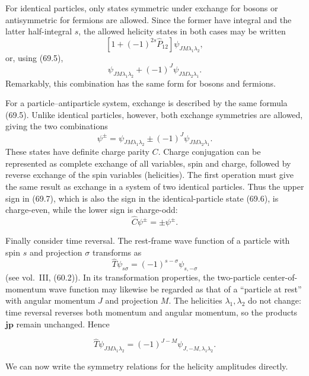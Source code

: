 For identical particles, only states symmetric under exchange for bosons or antisymmetric for fermions are allowed. Since the former have integral and the latter half-integral $s$, the allowed helicity states in both cases may be written
\[
\left[1+(-1)^{2s}\widehat P_{12}\right]\psi_{JM\lambda_1\lambda_2},
\]
or, using (69.5),
\begin{equation}
\psi_{JM\lambda_1\lambda_2}+(-1)^J\psi_{JM\lambda_2\lambda_1}.
\tag{69.6}
\end{equation}
Remarkably, this combination has the same form for bosons and fermions.

For a particle--antiparticle system, exchange is described by the same formula (69.5). Unlike identical particles, however, both exchange symmetries are allowed, giving the two combinations
\begin{equation}
\psi^\pm=\psi_{JM\lambda_1\lambda_2}\pm(-1)^J\psi_{JM\lambda_2\lambda_1}.
\tag{69.7}
\end{equation}
These states have definite charge parity $C$. Charge conjugation can be represented as complete exchange of all variables, spin and charge, followed by reverse exchange of the spin variables (helicities). The first operation must give the same result as exchange in a system of two identical particles. Thus the upper sign in (69.7), which is also the sign in the identical-particle state (69.6), is charge-even, while the lower sign is charge-odd:
\[
\widehat C\psi^\pm=\pm\psi^\pm.
\]

Finally consider time reversal. The rest-frame wave function of a particle with spin $s$ and projection $\sigma$ transforms as
\[
\widehat T\psi_{s\sigma}=(-1)^{s-\sigma}\psi_{s,-\sigma}
\]
(see vol.~III, (60.2)). In its transformation properties, the two-particle center-of-momentum wave function may likewise be regarded as that of a ``particle at rest'' with angular momentum $J$ and projection $M$. The helicities $\lambda_1,\lambda_2$ do not change: time reversal reverses both momentum and angular momentum, so the products $\mathbf j\mathbf p$ remain unchanged. Hence

\begin{equation}
\widehat T\psi_{JM\lambda_1\lambda_2}
=(-1)^{J-M}\psi_{J,-M,\lambda_1\lambda_2}.
\tag{69.8}
\end{equation}

We can now write the symmetry relations for the helicity amplitudes directly.

